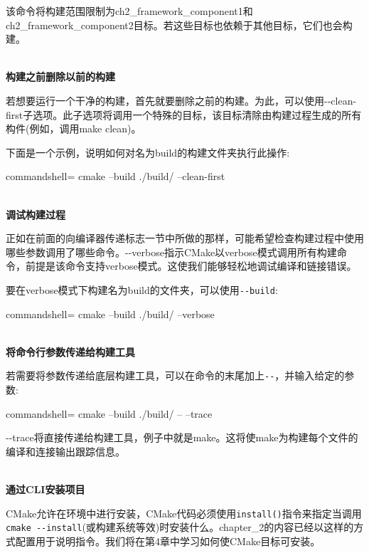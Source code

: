 该命令将构建范围限制为ch2\_framework\_component1和ch2\_framework\_component2目标。若这些目标也依赖于其他目标，它们也会构建。

\hspace*{\fill} \\ %
\noindent
\textbf{构建之前删除以前的构建}

若想要运行一个干净的构建，首先就要删除之前的构建。为此，可以使用-{}-clean-first子选项。此子选项将调用一个特殊的目标，该目标清除由构建过程生成的所有构件(例如，调用make clean)。

下面是一个示例，说明如何对名为build的构建文件夹执行此操作:

\begin{tcblisting}{commandshell={}}
cmake --build ./build/ --clean-first
\end{tcblisting}

\hspace*{\fill} \\ %
\noindent
\textbf{调试构建过程}

正如在前面的向编译器传递标志一节中所做的那样，可能希望检查构建过程中使用哪些参数调用了哪些命令。-{}-verbose指示CMake以verbose模式调用所有构建命令，前提是该命令支持verbose模式。这使我们能够轻松地调试编译和链接错误。

要在verbose模式下构建名为build的文件夹，可以使用\texttt{-{}-build}:

\begin{tcblisting}{commandshell={}}
cmake --build ./build/ --verbose
\end{tcblisting}

\hspace*{\fill} \\ %
\noindent
\textbf{将命令行参数传递给构建工具}

若需要将参数传递给底层构建工具，可以在命令的末尾加上\texttt{-{}-}，并输入给定的参数:

\begin{tcblisting}{commandshell={}}
cmake --build ./build/ -- --trace
\end{tcblisting}

-{}-trace将直接传递给构建工具，例子中就是make。这将使make为构建每个文件的编译和连接输出跟踪信息。

\hspace*{\fill} \\ %
\noindent
\textbf{通过CLI安装项目}

CMake允许在环境中进行安装，CMake代码必须使用\texttt{install()}指令来指定当调用\texttt{cmake -{}-install}(或构建系统等效)时安装什么。chapter\_2的内容已经以这样的方式配置用于说明指令。我们将在第4章中学习如何使CMake目标可安装。

